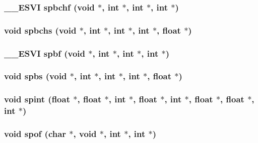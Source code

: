 \subsubsection{\setlength{\rightskip}{0pt plus 5cm}\_\-\_\-ESVI spbchf (void $\ast$, int $\ast$, int $\ast$, int $\ast$)}\label{essl_8h_269d7eb2229cae8db0b8904e73bec9bd}


\subsubsection{\setlength{\rightskip}{0pt plus 5cm}void spbchs (void $\ast$, int $\ast$, int $\ast$, int $\ast$, float $\ast$)}\label{essl_8h_e74b437c3f80ddc1b1883273a8455a8a}


\subsubsection{\setlength{\rightskip}{0pt plus 5cm}\_\-\_\-ESVI spbf (void $\ast$, int $\ast$, int $\ast$, int $\ast$)}\label{essl_8h_e68563e593b933c0671ff8e27a7a9481}


\subsubsection{\setlength{\rightskip}{0pt plus 5cm}void spbs (void $\ast$, int $\ast$, int $\ast$, int $\ast$, float $\ast$)}\label{essl_8h_1fa432780a2e6a252f8b0d6b003b2e38}


\subsubsection{\setlength{\rightskip}{0pt plus 5cm}void spint (float $\ast$, float $\ast$, int $\ast$, float $\ast$, int $\ast$, float $\ast$, float $\ast$, int $\ast$)}\label{essl_8h_fbabbfe6ffc33b7fcf6a3dda3ebc1f52}


\subsubsection{\setlength{\rightskip}{0pt plus 5cm}void spof (char $\ast$, void $\ast$, int $\ast$, int $\ast$)}\label{essl_8h_20bca0d8891bd695989c339bb27921a4}


